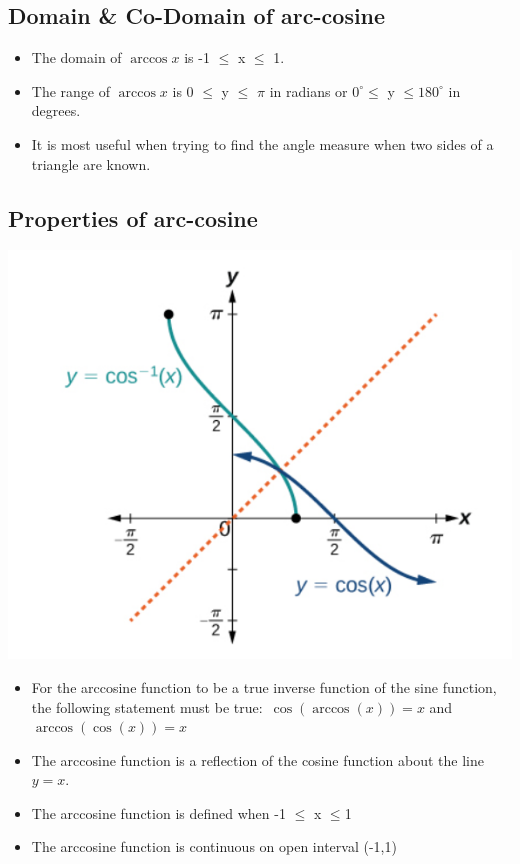 \documentclass[a4paper,10pt]{report}
\begin{document}
\subsection{Domain \& Co-Domain of arc-cosine}
\begin{itemize}[noitemsep]
\item The domain of $\arccos x $ is  -1 $\leq$ x $\leq$ 1.
\item The range of $\arccos x $ is  0 $\leq$ y $\leq$ $\pi$ in radians or $0^{\circ}$$\leq$ y $\leq$$180^{\circ}$ in degrees.
\item It is most useful when trying to find the angle measure when two sides of a triangle are known.
\end{itemize}

\subsection{Properties of arc-cosine}
    \begin{minipage}{0.40\textwidth}
    \centering
    \includegraphics[width=\textwidth]{Capturelast.PNG}
    \end{minipage}
    \begin{minipage}{0.60\textwidth}
    \begin{itemize}[noitemsep]
      \item For the arccosine function to be a true inverse function of the sine function, the following statement must be true$\colon$ $\cos(\arccos(x))=x$ and $\arccos(\cos(x))=x$
      \item The arccosine function is a reflection of the cosine function about the line $y=x$.
      \item The arccosine function is defined when -1 $\leq$ x $\leq$1
      \item The arccosine function is continuous on open interval (-1,1)
      
    \end{itemize}
    \end{minipage}
\end{document}

